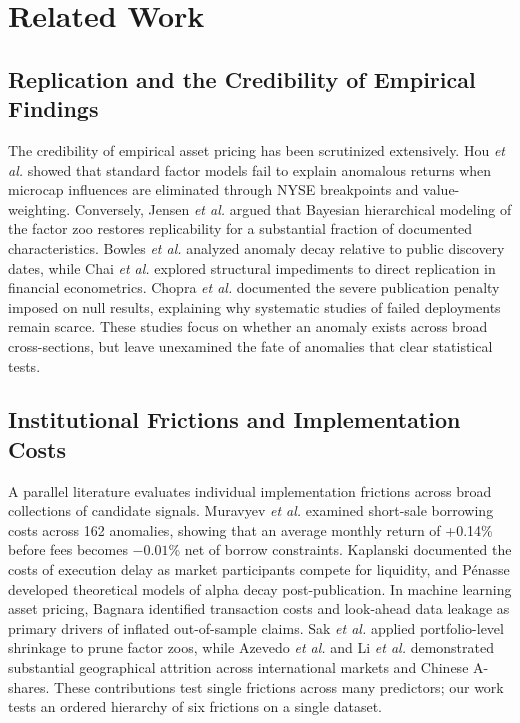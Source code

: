 \documentclass{ieeeaccess}
\begin{document}
\section{Related Work}
\label{sec:related_work}

\subsection{Replication and the Credibility of Empirical Findings}
The credibility of empirical asset pricing has been scrutinized extensively. Hou \textit{et al.} \cite{hou2020replicating} showed that standard factor models fail to explain anomalous returns when microcap influences are eliminated through NYSE breakpoints and value-weighting. Conversely, Jensen \textit{et al.} \cite{jensen2023there} argued that Bayesian hierarchical modeling of the factor zoo restores replicability for a substantial fraction of documented characteristics. Bowles \textit{et al.} \cite{bowles2024anomaly} analyzed anomaly decay relative to public discovery dates, while Chai \textit{et al.} \cite{chai2026understanding} explored structural impediments to direct replication in financial econometrics. Chopra \textit{et al.} \cite{chopra2023null} documented the severe publication penalty imposed on null results, explaining why systematic studies of failed deployments remain scarce. These studies focus on whether an anomaly exists across broad cross-sections, but leave unexamined the fate of anomalies that clear statistical tests.

\subsection{Institutional Frictions and Implementation Costs}
A parallel literature evaluates individual implementation frictions across broad collections of candidate signals. Muravyev \textit{et al.} \cite{muravyev2025anomalies} examined short-sale borrowing costs across 162 anomalies, showing that an average monthly return of +0.14\% before fees becomes $-0.01$\% net of borrow constraints. Kaplanski \cite{kaplanski2023race} documented the costs of execution delay as market participants compete for liquidity, and P{\'e}nasse \cite{penasse2022understanding} developed theoretical models of alpha decay post-publication. In machine learning asset pricing, Bagnara \cite{bagnara2024asset} identified transaction costs and look-ahead data leakage as primary drivers of inflated out-of-sample claims. Sak \textit{et al.} \cite{sak2024exploring} applied portfolio-level shrinkage to prune factor zoos, while Azevedo \textit{et al.} \cite{azevedo2023stock} and Li \textit{et al.} \cite{li2024replicating} demonstrated substantial geographical attrition across international markets and Chinese A-shares. These contributions test single frictions across many predictors; our work tests an ordered hierarchy of six frictions on a single dataset.
\end{document}
